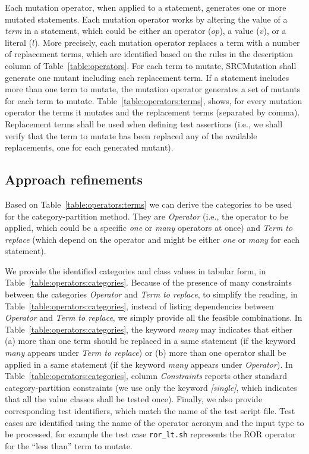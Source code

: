 Each mutation operator, when applied to a statement, generates one or more mutated statements.
Each mutation operator works by altering the value of a \emph{term} in a statement, which could be either an operator  ($op$), a value ($v$), or a literal ($l$). More precisely, each mutation operator replaces a term with a number of replacement terms, which are identified based on the rules in the description column of Table~\ref{table:operators}.
For each term to mutate, SRCMutation shall generate one mutant including each replacement term.
If a statement includes more than one term to mutate, the mutation operator generates a set of mutants for each term to mutate. Table~\ref{table:operators:terms}, shows, for every mutation operator the terms it mutates and the replacement terms (separated by comma). Replacement terms shall be used when defining test assertions (i.e., we shall verify that the term to mutate has been replaced any of the available replacements, one for each generated mutant).




\clearpage

\subsection{Approach refinements}

Based on Table~\ref{table:operators:terms} we can derive the categories to be used for the category-partition method. 
They are \emph{Operator} (i.e., the operator to be applied, which could be a specific \emph{one} or \emph{many} operators at once) and \emph{Term to replace} (which depend on the operator and might be either \emph{one} or \emph{many} for each statement).

We provide the identified categories and class values in tabular form, in Table~\ref{table:operators:categories}. 
Because of the presence of many constraints between the categories \emph{Operator} and \emph{Term to replace}, 
to simplify the reading, in Table~\ref{table:operators:categories}, instead of listing dependencies between \emph{Operator} and \emph{Term to replace}, we simply provide all the feasible combinations.
In Table~\ref{table:operators:categories}, the keyword \emph{many} may indicates that either (a) more than one term should be replaced in a same statement (if the keyword \emph{many} appears under \emph{Term to replace}) or (b) more than one operator shall be applied in a same statement (if the keyword \emph{many} appears under \emph{Operator}).
In Table~\ref{table:operators:categories}, column \emph{Constraints} reports other standard category-partition constraints (we use only the keyword \emph{[single]}, which indicates that all the value classes shall be tested once).
Finally, we also provide corresponding test identifiers, which match the name of the test script file. Test cases are identified using the name of the operator acronym and the input type to be processed, for example the test case \texttt{ror\_lt.sh} represents the ROR operator for the ``less than'' term to mutate.





